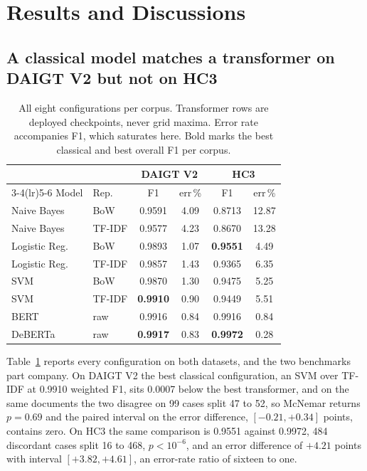 \section{Results and Discussions}
\label{sec:results}

\subsection{A classical model matches a transformer on DAIGT V2 but not on HC3}

\begin{table}[!ht]
\centering
\caption{All eight configurations per corpus. Transformer rows are deployed checkpoints, never grid maxima. Error rate accompanies F1, which saturates here. Bold marks the best classical and best overall F1 per corpus.}
\label{tab:allmodels}
\footnotesize
\setlength{\tabcolsep}{3.5pt}
\begin{tabular}{@{}llcccc@{}}
\toprule
& & \multicolumn{2}{c}{DAIGT V2} & \multicolumn{2}{c}{HC3} \\
\cmidrule(lr){3-4}\cmidrule(lr){5-6}
Model & Rep. & F1 & err\,\% & F1 & err\,\% \\
\midrule
Naive Bayes & BoW & 0.9591 & 4.09 & 0.8713 & 12.87 \\
Naive Bayes & TF-IDF & 0.9577 & 4.23 & 0.8670 & 13.28 \\
Logistic Reg. & BoW & 0.9893 & 1.07 & \textbf{0.9551} & 4.49 \\
Logistic Reg. & TF-IDF & 0.9857 & 1.43 & 0.9365 & 6.35 \\
SVM & BoW & 0.9870 & 1.30 & 0.9475 & 5.25 \\
SVM & TF-IDF & \textbf{0.9910} & 0.90 & 0.9449 & 5.51 \\
BERT & raw & 0.9916 & 0.84 & 0.9916 & 0.84 \\
DeBERTa & raw & \textbf{0.9917} & 0.83 & \textbf{0.9972} & 0.28 \\
\bottomrule
\end{tabular}
\end{table}

Table~\ref{tab:allmodels} reports every configuration on both datasets, and the two benchmarks part company. On DAIGT V2 the best classical configuration, an SVM over TF-IDF at 0.9910 weighted F1, sits 0.0007 below the best transformer, and on the same documents the two disagree on 99 cases split 47 to 52, so McNemar returns $p=0.69$ and the paired interval on the error difference, $[-0.21, +0.34]$ points, contains zero. On HC3 the same comparison is 0.9551 against 0.9972, 484 discordant cases split 16 to 468, $p < 10^{-6}$, and an error difference of $+4.21$ points with interval $[+3.82, +4.61]$, an error-rate ratio of sixteen to one.

